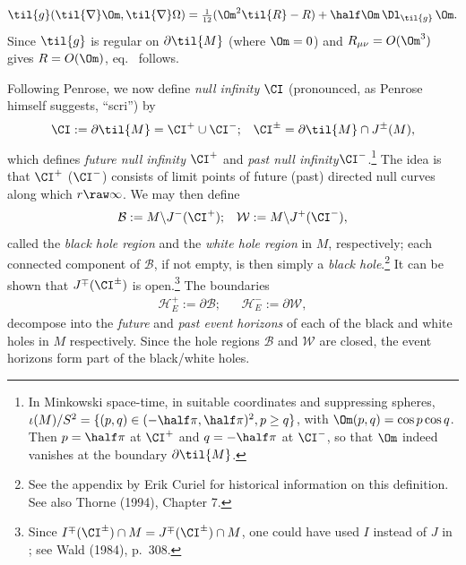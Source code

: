 \documentclass[12pt]{article}
\newcommand{\n}{\nabla}
\newcommand{\p}{\partial}
\begin{document}
\begin{equation}
\til{g}(\til{\nabla} \Om, \til{\nabla}\Omega)=\mbox{\footnotesize $\frac{1}{12}$}(\Om^2\til{R}-R)+\half \Om\,\Dl_{\til{g}}\,\Om.\label{preeikonal} 
\end{equation}
Since $\til{g}$ is regular on $\p\til{M}$ (where $\Om=0$) and $R_{\mu\nu}=O(\Om^3)$ gives $R=O(\Om)$, eq.\   follows.
 \enp
 
\smallskip 
\noindent Following Penrose, we now define  \emph{null infinity}  $\CI$ (pronounced, as Penrose himself suggests, ``scri'') by
  \begin{align}
\CI:=\p\til{M}=\CI^+\cup\CI^-; && \CI^{\pm}=\p\til{M}\cap J^{\pm}(M),
\end{align}
which defines  \emph{future null infinity} $\CI^+$ and  \emph{past null infinity}$\CI^-$.\footnote{In Minkowski space-time, in suitable coordinates and suppressing spheres, $\iota(M)/S^2=\{(p,q)\in(-\half\pi,\half\pi)^2,p\geq q\}$, with  $\Om(p,q)=\cos p\cos q$. Then $p=\half \pi$ at $\CI^+$ and $q=-\half\pi$ at $\CI^-$,  so that $\Om$ indeed vanishes at the boundary $\p\til{M}$. } The idea is that $\CI^+$ ($\CI^-$) consists of limit points of future (past) directed null curves along which $r\raw\infty$. 
We may then define 
   \begin{align}
  \mathcal{B}:= M\backslash J^-(\CI^+); &&   \mathcal{W}:= M\backslash J^+(\CI^-), \label{BHRWHR}
  \end{align}
  called the \emph{black hole region} and the \emph{white hole region}  in $M$, respectively;
   each connected component of $  \mathcal{B}$, if not empty, is then simply a \emph{black hole}.\footnote{
  See the appendix by Erik Curiel for historical information on this definition.
  See also Thorne (1994), Chapter 7.} It can be shown that $J^{\mp}(\CI^{\pm})$ is open.\footnote{
  Since $I^{\mp}(\CI^{\pm})\cap M=J^{\mp}(\CI^{\pm})\cap M$, one could have used $I$ instead of $J$ in ; see Wald (1984), p.\ 308.}
 The 
boundaries
    \begin{align}
 \mathcal{H}_E^+:=\p \mathcal{B}; &&   \mathcal{H}_E^-:=\p  \mathcal{W}, \label{defEHplus}
  \end{align}
  decompose into the \emph{future} and \emph{past event horizons} of each of the black and white holes in $M$ respectively. 
  Since the hole regions $\mathcal{B}$ and $\mathcal{W}$  are closed, the event horizons form part of  the black/white holes. 
    
\end{document}
